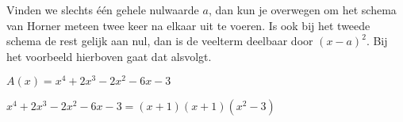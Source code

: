 \documentclass{ximera}
\begin{document}
Vinden we slechts één gehele nulwaarde \(a\), dan kun je overwegen om  het schema van Horner meteen twee keer na elkaar uit te voeren. Is ook bij het tweede schema de rest gelijk aan nul, dan is de veelterm deelbaar door \((x-a)^2\). Bij het voorbeeld hierboven gaat dat alsvolgt.

\renewcommand{\kolbreed}{\widthof{\(-6\)}}

\(A(x) = x^4 + 2x^3 - 2x^2 - 6x - 3 \)


\( x^4 + 2x^3 - 2x^2 - 6x - 3 = (x+1)(x+1)(x^2-3) \)
\end{document}

